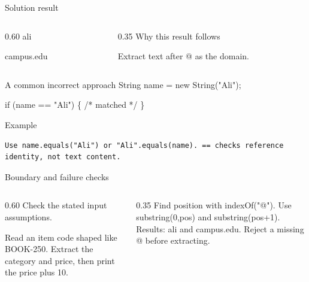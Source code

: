 \documentclass[10pt,aspectratio=169]{beamer}
\begin{document}
\begin{frame}[fragile,t]{Solution result}
\begin{columns}[T,onlytextwidth]\begin{column}{0.60\textwidth}
ali\par campus.edu
\end{column}\begin{column}{0.35\textwidth}\small
Why this result follows

Extract text after @ as the domain.
\end{column}\end{columns}
\end{frame}

\begin{frame}[fragile,t]{A common incorrect approach}
String name = new String("Ali");\par if (name == "Ali") \{ /* matched */ \}
\vspace{1mm}\begin{block}{Example}
\begin{lstlisting}
Use name.equals("Ali") or "Ali".equals(name). == checks reference identity, not text content.
\end{lstlisting}
\end{block}
\end{frame}

\begin{frame}[fragile,t]{Boundary and failure checks}
\begin{columns}[T,onlytextwidth]\begin{column}{0.60\textwidth}
Check the stated input assumptions.

Read an item code shaped like BOOK-250. Extract the category and price, then print the price plus 10.
\end{column}\begin{column}{0.35\textwidth}\small
Find position with indexOf("@"). Use substring(0,pos) and substring(pos+1). Results: ali and campus.edu. Reject a missing @ before extracting.
\end{column}\end{columns}
\end{frame}
\end{document}
